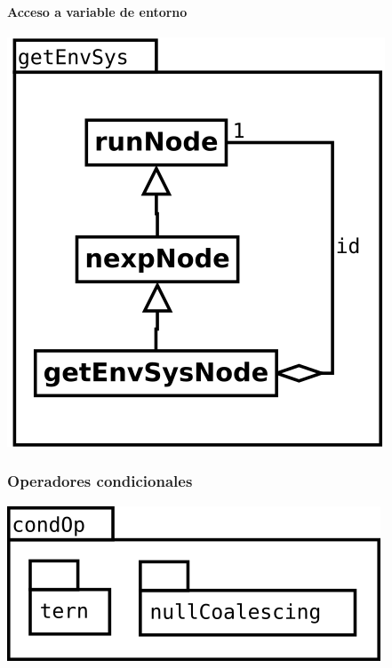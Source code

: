 \paragraph {Acceso a variable de entorno} 
\begin{center}
\includegraphics[scale=0.4]{getEnvSys.png} \\
\end{center}

\pagebreak
\subsubsection {Operadores condicionales} 
\begin{center}
\includegraphics[scale=0.4]{condOp-package.png} \\
\end{center}

